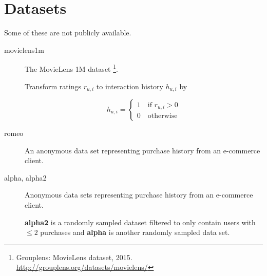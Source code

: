 \chapter{Datasets}\label{cha:datasets}

Some of these are not publicly available.


\begin{description}
    \item[movielens1m]

        The MovieLens 1M dataset \footnote{Grouplens: MovieLens dataset, 2015. \url{http://grouplens.org/datasets/movielens/}}.

        Transform ratings $r_{u, i}$ to interaction history $h_{u, i}$ by

        \begin{equation}\label{eq:hist}
            h_{u, i} = \begin{cases}
                1 \quad \text{if } r_{u, i} > 0 \\
                0 \quad \text{otherwise}
            \end{cases}
        \end{equation}


    \item[romeo]

        An anonymous data set representing purchase history from an e-commerce client.


    \item[alpha, alpha2]

        Anonymous data sets representing purchase history from an e-commerce client.

        \textbf{alpha2} is a randomly sampled dataset filtered to only contain users with $\leq 2$ purchases and \textbf{alpha} is another randomly sampled data set.




\end{description}
